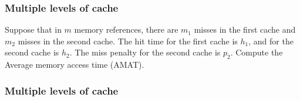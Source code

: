 \begin{frame}
    \frametitle{Multiple levels of cache}
    Suppose that in $m$ memory references, there are $m_{1}$ misses in the first cache and $m_{2}$ misses in the second cache.
    The hit time for the first cache is $h_{1}$, and for the second cache is $h_{2}$.
    The miss penalty for the second cache is $p_{2}$.
    Compute the Average memory access time (AMAT).
\end{frame}
\begin{frame}
    \frametitle{Multiple levels of cache}
\end{frame}